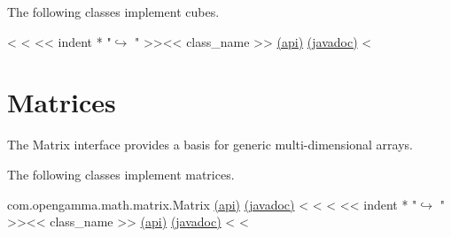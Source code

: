 The following classes implement cubes.

\begin{fullwidth}
<%
<%
<< indent * "$\hookrightarrow$ " >><< class_name >> \href{http://docs-static.opengamma.com/{{ OG_VERSION }}/analytics/api/<< package_name >>.html#class-<<class_name>>}{(api)} \href{http://docs-static.opengamma.com/{{ OG_VERSION }}/java/javadocs/<< class_name.replace(".","/") >>.html}{(javadoc)}
<%
\end{fullwidth}

\section{Matrices}

The Matrix interface provides a basis for generic multi-dimensional arrays.

The following classes implement matrices.

\begin{fullwidth}

com.opengamma.math.matrix.Matrix \href{http://docs-static.opengamma.com/{{ OG_VERSION }}/analytics/api/com.opengamma.math.matrix.Matrix.html#class-com.opengamma.math.matrix.Matrix}{(api)} \href{http://docs-static.opengamma.com/{{ OG_VERSION }}/analytics/javadoc/com/opengamma/math/matrix/Matrix}{(javadoc)}
<%
<%
<%
<< indent * "$\hookrightarrow$ " >><< class_name >> \href{http://docs-static.opengamma.com/{{ OG_VERSION }}/analytics/api/<< package_name >>.html#class-<<class_name>>}{(api)} \href{http://docs-static.opengamma.com/{{ OG_VERSION }}/java/javadocs/<< class_name.replace(".","/") >>.html}{(javadoc)}
<%
<%

\end{fullwidth}

